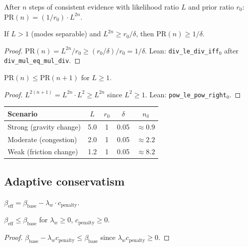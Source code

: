 \begin{definition}
After $n$ steps of consistent evidence with likelihood ratio $L$ and prior ratio $r_0$:
$\mathrm{PR}(n) = (1/r_0) \cdot L^{2n}$.
\end{definition}

\begin{theorem}
If $L > 1$ (modes separable) and $L^{2n} \ge r_0/\delta$, then $\mathrm{PR}(n) \ge 1/\delta$.
\end{theorem}
\begin{proof}
$\mathrm{PR}(n) = L^{2n}/r_0 \ge (r_0/\delta)/r_0 = 1/\delta$.  Lean: \texttt{div\_le\_div\_iff}$_{\!0}$ after \texttt{div\_mul\_eq\_mul\_div}.
\end{proof}

\begin{theorem}
$\mathrm{PR}(n) \le \mathrm{PR}(n+1)$ for $L \ge 1$.
\end{theorem}
\begin{proof}
$L^{2(n+1)} = L^{2n} \cdot L^2 \ge L^{2n}$ since $L^2 \ge 1$.  Lean: \texttt{pow\_le\_pow\_right}$_{\!0}$.
\end{proof}

\begin{center}
\begin{tabular}{lcccc}
\toprule
\textbf{Scenario} & $L$ & $r_0$ & $\delta$ & $n_\delta$ \\
\midrule
Strong (gravity change) & 5.0 & 1 & 0.05 & $\approx 0.9$ \\
Moderate (congestion) & 2.0 & 1 & 0.05 & $\approx 2.2$ \\
Weak (friction change) & 1.2 & 1 & 0.05 & $\approx 8.2$ \\
\bottomrule
\end{tabular}
\end{center}

\subsection{Adaptive conservatism}

\begin{definition}
$\beta_{\mathrm{eff}} = \beta_{\mathrm{base}} - \lambda_w \cdot c_{\mathrm{penalty}}$.
\end{definition}

\begin{theorem}
$\beta_{\mathrm{eff}} \le \beta_{\mathrm{base}}$ for $\lambda_w \ge 0$, $c_{\mathrm{penalty}} \ge 0$.
\end{theorem}
\begin{proof}
$\beta_{\mathrm{base}} - \lambda_w c_{\mathrm{penalty}} \le \beta_{\mathrm{base}}$ since $\lambda_w c_{\mathrm{penalty}} \ge 0$.
\end{proof}

